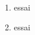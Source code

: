 \documentclass{beamer}
\begin{document}
\begin{frame}
\begin{enumerate}
\parsep\plparsep
\itemsep\plitemsep
\topsep\pltopsep
\partopsep\plpartopsep
\item essai
\item essai
\end{enumerate}

\end{frame}
\end{document}
